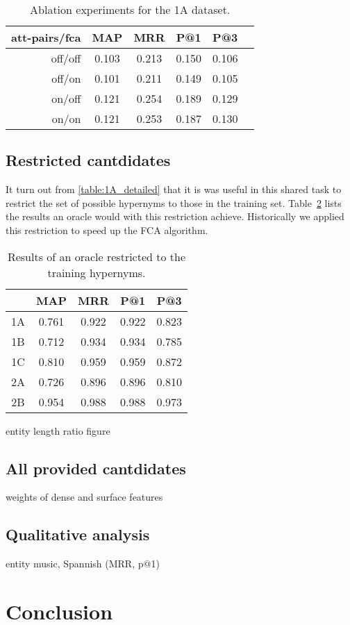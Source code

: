 \documentclass[11pt,a4paper]{article}
\begin{document}
\begin{table}
	\centering
	\begin{tabular}{r|ccccc}
att-pairs/fca & MAP & MRR & P@1 & P@3 \\ \hline
off/off & 0.103 & 0.213 & 0.150 & 0.106 \\
off/on  & 0.101 & 0.211 & 0.149 & 0.105 \\
on/off  & 0.121 & 0.254 & 0.189 & 0.129 \\
on/on   & 0.121 & 0.253 & 0.187 & 0.130 \\
	\end{tabular}
\caption{Ablation experiments for the 1A dataset.}
\label{table:ablation1A}
\end{table}

\subsection{Restricted cantdidates}

It turn out from \autoref{table:1A_detailed} that it is was useful in this
shared task to restrict the set of possible hypernyms to those in the training
set.  Table~\ref{table:upper} lists the results an oracle would with this
restriction achieve. Historically we applied this restriction to speed up the
FCA algorithm.

\begin{table}
	\centering
	\begin{tabular}{c|cccc}
		   & MAP & MRR & P@1  & P@3 \\ \hline
		1A & 0.761 & 0.922 & 0.922 & 0.823 \\
		1B & 0.712 & 0.934 & 0.934 & 0.785 \\
		1C & 0.810 & 0.959 & 0.959 & 0.872 \\
		2A & 0.726 & 0.896 & 0.896 & 0.810 \\
		2B & 0.954 & 0.988 & 0.988 & 0.973 \\
	\end{tabular}
  \caption{Results of an oracle restricted to the training hypernyms.}
	\label{table:upper}
\end{table}

entity length ratio figure %

\subsection{All provided cantdidates}

weights of dense and surface features %

\subsection{Qualitative analysis} %

entity music, Spannish (MRR, p@1)

\section{Conclusion}



\end{document}
